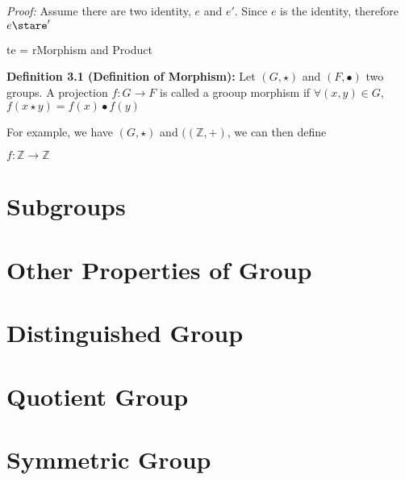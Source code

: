 \documentclass[12pt,openany]{book}
\theoremstyle{definition}
\theoremstyle{definition}
\begin{document}
\textit{Proof:} Assume there are two identity, $e $ and $ e'$. Since $e$ is the identity, therefore $e\stare'$

 \chap te = r{Morphism and Product}

\noindent\textbf{Definition 3.1 (Definition of Morphism):} Let $(G, \star)$ and $(F, \bullet)$ two groups. A projection $f: G \to F$ is called a grooup morphism if $\forall (x, y) \in G$, $f(x \star y) = f(x) \bullet f(y)$

For example, we have $(G, \star)$ and $((\mathbb{Z}, +)$, we can then define

$f: \mathbb{Z} \to \mathbb{Z}$

\chapter{Subgroups}

\chapter{Other Properties of Group}

\chapter{Distinguished Group}

\chapter{Quotient Group}

\chapter{Symmetric Group}
\end{document}
